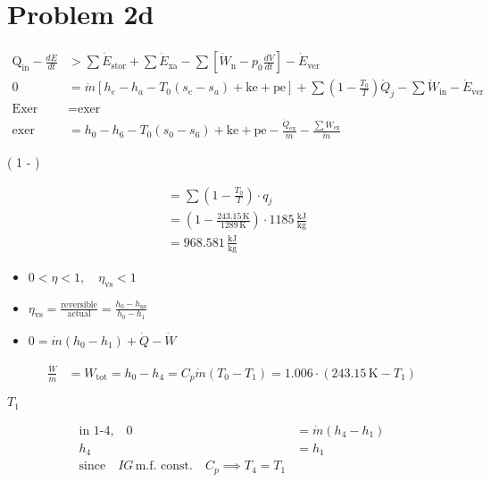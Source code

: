\section*{Problem 2d}

\begin{align*}
\text{Q}_{\text{in}} - \frac{dE}{dt} &> \sum \dot{E}_{\text{stor}} + \sum \dot{E}_{\text{xa}} - \sum \left[ \dot{W}_{\text{n}} - p_0 \frac{dV}{dt} \right] - \dot{E}_{\text{ver}} \\
0 &= \dot{m} \left[ h_e - h_a - T_0 (s_e - s_a) + \text{ke} + \text{pe} \right] + \sum \left( 1 - \frac{T_0}{T} \right) \dot{Q}_j - \sum \dot{W}_{\text{in}} - \dot{E}_{\text{ver}} \\
\text{Exer} &= \text{exer} \\
\text{exer} &= h_0 - h_6 - T_0 (s_0 - s_6) + \text{ke} + \text{pe} - \frac{\dot{Q}_{\text{ex}}}{\dot{m}} - \frac{\sum \dot{W}_{\text{ex}}}{\dot{m}}
\end{align*}

 \quad \sum \left( 1 -  \right) 

\begin{align*}
&= \sum \left( 1 - \frac{T_0}{T} \right) \cdot q_j \\
&= \left( 1 - \frac{243.15 \, \text{K}}{1289 \, \text{K}} \right) \cdot 1185 \, \frac{\text{kJ}}{\text{kg}} \\
&= 968.581 \, \frac{\text{kJ}}{\text{kg}}
\end{align*}

\begin{itemize}
    \item $0 < \eta < 1, \quad \eta_{\text{vs}} < 1$
    \item $\eta_{\text{vs}} = \frac{\text{reversible}}{\text{actual}} = \frac{h_0 - h_{\text{ns}}}{h_0 - h_1}$
    \item {} $0 = \dot{m} (h_0 - h_1) + \dot{Q} - \dot{W}$
\end{itemize}

\begin{align*}
\frac{\dot{W}}{\dot{m}} &= W_{\text{tot}} = h_0 - h_4 = C_p \dot{m} (T_0 - T_1) = 1.006 \cdot (243.15 \, \text{K} - T_1)
\end{align*}

 $T_1$

\begin{align*}
\text{in 1-4,} \quad 0 &= \dot{m} (h_4 - h_1) \\
h_4 &= h_1 \\
\text{since} \quad IG \, \text{m.f. const.} \quad C_p \implies T_4 = T_1
\end{align*}

